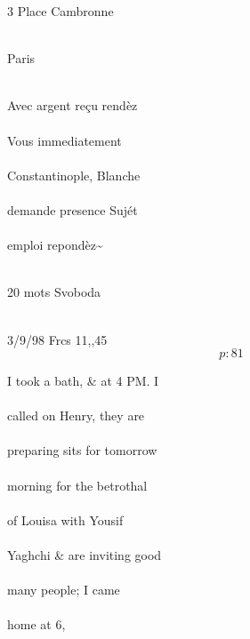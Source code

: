 \documentclass{report}
\begin{document}
	\par{
 	3 Place Cambronne\ \\\ \\
	}

	\par{
 	Paris\ \\\ \\
	}

	\par{
 	Avec argent reçu rendèz\ \\\ \\Vous immediatement\ \\\ \\Constantinople, Blanche\ \\\ \\demande presence Sujét\ \\\ \\emploi repondèz\~{}\ \\\ \\
	}

	\par{
 	20 mots Svoboda\ \\\ \\
	}

	\par{
 	3/9/98 Frcs 11,,45\ \\
  \[p: 81 \]

	}




	\par{
 	I took a bath, \& at 4 PM. I\ \\\ \\called on Henry, they are\ \\\ \\preparing sits for tomorrow\ \\\ \\morning for the betrothal\ \\\ \\of Louisa with Yousif\ \\\ \\Yaghchi \& are inviting good\ \\\ \\many people; I came\ \\\ \\home at 6,\ \\\ \\
	}
\end{document}

